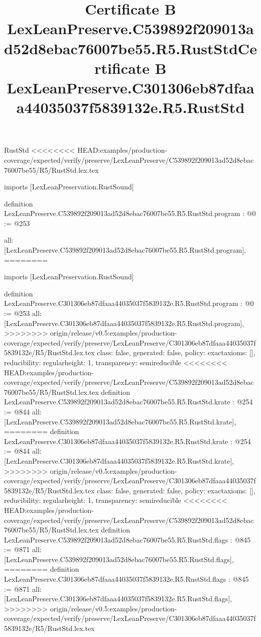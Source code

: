 \begin{lexlean}{RustStd}
<<<<<<<< HEAD:examples/production-coverage/expected/verify/preserve/LexLeanPreserve/C539892f209013ad52d8ebac76007be55/R5/RustStd.lex.tex
\title{Certificate B LexLeanPreserve.C539892f209013ad52d8ebac76007be55.R5.RustStd}
\begin{coremodule}
imports [LexLeanPreservation.RustSound]

definition LexLeanPreserve.C539892f209013ad52d8ebac76007be55.R5.RustStd.program : @0 := @253 {
  all: [LexLeanPreserve.C539892f209013ad52d8ebac76007be55.R5.RustStd.program],
========
\title{Certificate B LexLeanPreserve.C301306eb87dfaaa44035037f5839132e.R5.RustStd}
\begin{coremodule}
imports [LexLeanPreservation.RustSound]

definition LexLeanPreserve.C301306eb87dfaaa44035037f5839132e.R5.RustStd.program : @0 := @253 {
  all: [LexLeanPreserve.C301306eb87dfaaa44035037f5839132e.R5.RustStd.program],
>>>>>>>> origin/release/v0.5:examples/production-coverage/expected/verify/preserve/LexLeanPreserve/C301306eb87dfaaa44035037f5839132e/R5/RustStd.lex.tex
  class: false,
  generated: false,
  policy: exact{axioms: []},
  reducibility: regular{height: 1},
  transparency: semireducible
}
<<<<<<<< HEAD:examples/production-coverage/expected/verify/preserve/LexLeanPreserve/C539892f209013ad52d8ebac76007be55/R5/RustStd.lex.tex
definition LexLeanPreserve.C539892f209013ad52d8ebac76007be55.R5.RustStd.krate : @254 := @844 {
  all: [LexLeanPreserve.C539892f209013ad52d8ebac76007be55.R5.RustStd.krate],
========
definition LexLeanPreserve.C301306eb87dfaaa44035037f5839132e.R5.RustStd.krate : @254 := @844 {
  all: [LexLeanPreserve.C301306eb87dfaaa44035037f5839132e.R5.RustStd.krate],
>>>>>>>> origin/release/v0.5:examples/production-coverage/expected/verify/preserve/LexLeanPreserve/C301306eb87dfaaa44035037f5839132e/R5/RustStd.lex.tex
  class: false,
  generated: false,
  policy: exact{axioms: []},
  reducibility: regular{height: 1},
  transparency: semireducible
}
<<<<<<<< HEAD:examples/production-coverage/expected/verify/preserve/LexLeanPreserve/C539892f209013ad52d8ebac76007be55/R5/RustStd.lex.tex
definition LexLeanPreserve.C539892f209013ad52d8ebac76007be55.R5.RustStd.flags : @845 := @871 {
  all: [LexLeanPreserve.C539892f209013ad52d8ebac76007be55.R5.RustStd.flags],
========
definition LexLeanPreserve.C301306eb87dfaaa44035037f5839132e.R5.RustStd.flags : @845 := @871 {
  all: [LexLeanPreserve.C301306eb87dfaaa44035037f5839132e.R5.RustStd.flags],
>>>>>>>> origin/release/v0.5:examples/production-coverage/expected/verify/preserve/LexLeanPreserve/C301306eb87dfaaa44035037f5839132e/R5/RustStd.lex.tex
}}}
\end{coremodule}}
\end{coremodule}
\end{lexlean}
